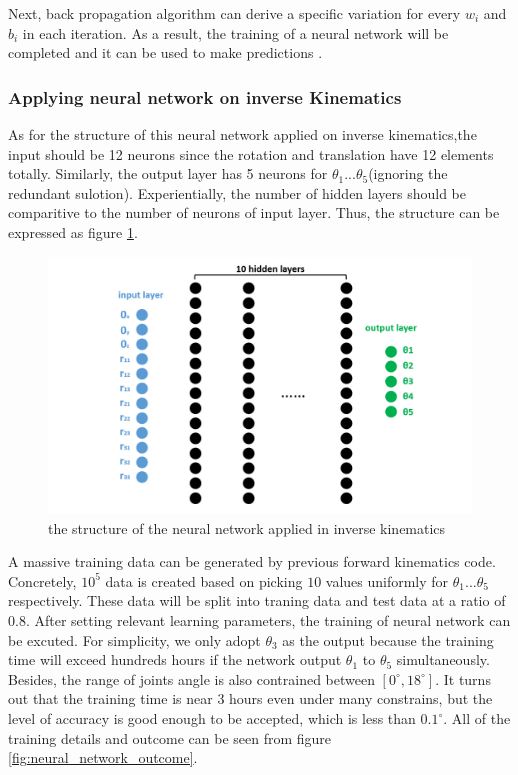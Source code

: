Next, back propagation algorithm can derive a specific variation for every $w_i$ and $b_i$ in each iteration. As a result, the training of a neural network will be completed and it can be used to make predictions \citep{rumelhart1986learning}.  

\subsubsection{Applying neural network on inverse Kinematics}
As for the structure of this neural network applied on inverse kinematics,the input should be 12 neurons since the rotation and translation have 12 elements totally. Similarly, the output layer has 5 neurons for $\theta_1...\theta_5$(ignoring the redundant sulotion). Experientially, the number of hidden layers should be comparitive to the number of neurons of input layer. Thus, the structure can be expressed as figure \ref{fig:IK_neural_network}. 

\begin{figure}[htbp] 
\begin{center}
\includegraphics[width=\textwidth]{images/IK_neural_network}
\caption{the structure of the neural network applied in inverse kinematics}
\label{fig:IK_neural_network}
\end{center}
\end{figure}

A massive training data can be generated by previous forward kinematics code. Concretely, $10^5$ data is created based on picking $10$ values uniformly for $\theta_1...\theta_5$ respectively. These data will be split into traning data and test data at a ratio of $0.8$.
After setting relevant learning parameters, the training of neural network can be excuted. For simplicity, we only adopt $\theta_3$ as the output because the training time will exceed hundreds hours if the network output $\theta_1$ to $\theta_5$ simultaneously. Besides, the range of joints angle is also contrained between $[0^{\circ},18^{\circ}]$. 
It turns out that the training time is near 3 hours even under many constrains, but the level of accuracy is good enough to be accepted, which is less than $0.1^{\circ}$. All of the training details and outcome can be seen from figure \ref{fig:neural_network_outcome}.

